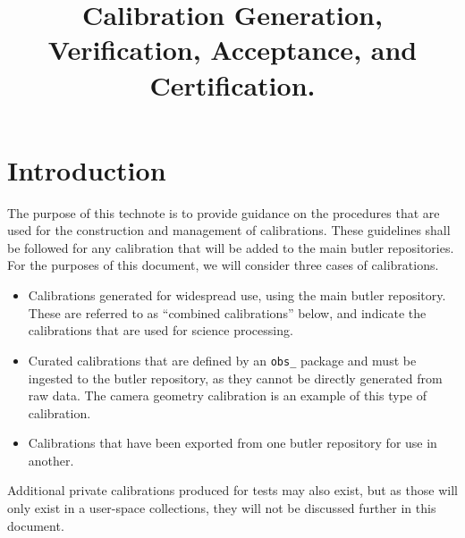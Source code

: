 \documentclass[DM,authoryear,toc]{lsstdoc}
\title{Calibration Generation, Verification, Acceptance, and Certification.}
\date{\vcsDate}
\begin{document}
\maketitle


\section{Introduction}

The purpose of this technote is to provide guidance on the procedures that are used for the construction and management of calibrations.
These guidelines shall be followed for any calibration that will be added to the main butler repositories.  For the purposes of this document, we will consider three cases of calibrations.

\begin{itemize}
\item Calibrations generated for widespread use, using the main butler repository.  These are referred to as ``combined calibrations'' below, and indicate the calibrations that are used for science processing.
\item Curated calibrations that are defined by an \verb|obs_| package and must be ingested to the butler repository, as they cannot be directly generated from raw data.  The camera geometry calibration is an example of this type of calibration.
\item Calibrations that have been exported from one butler repository for use in another.
\end{itemize}

Additional private calibrations produced for tests may also exist, but as those will only exist in a user-space collections, they will not be discussed further in this document.
\end{document}
